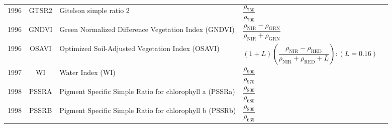 \documentclass[10pt]{article}
\begin{document}
\begin{ThreePartTable}
\begin{longtable}{c c m{2.80in} M{2.80in} M{1.5in}}
  1996 & GTSR2   & Gitelson simple ratio 2                                                        & $\dfrac{\rho_{750}}{\rho_{700}}$                                                                                                                                                                                                                                                        & \citet{Gitelson1996b,Gitelson1997,Lichtenthaler1996}\\
  1996 & GNDVI   & Green Normalized Difference Vegetation Index (GNDVI)                           & $\dfrac{\rho_\text{NIR}-\rho_\text{GRN}}{\rho_\text{NIR}+\rho_\text{GRN}}$                                                                                                                                                                                                              & \citet{Gitelson1996a}                               \\
  1996 & OSAVI   & Optimized Soil-Adjusted Vegetation Index (OSAVI)                               & $(1 + L)\left(\dfrac{\rho_\text{NIR}-\rho_\text{RED}}{\rho_\text{NIR}+\rho_\text{RED}+L}\right):(L=0.16)$                                                                                                                                                                               & \citet{Rondeaux1996}                                \\
  1997 & WI      & Water Index (WI)                                                               & $\dfrac{\rho_{900}}{\rho_{970}}$                                                                                                                                                                                                                                                        & \citet{Penuelas1997}                                \\
  1998 & PSSRA   & Pigment Specific Simple Ratio for chlorophyll a (PSSRa)                        & $\dfrac{\rho_{800}}{\rho_{680}}$                                                                                                                                                                                                                                                        & \citet{Blackburn1998a,Blackburn1998b}               \\
  1998 & PSSRB   & Pigment Specific Simple Ratio for chlorophyll b (PSSRb)                        & $\dfrac{\rho_{800}}{\rho_{635}}$                                                                                                                                                                                                                                                        & \citet{Blackburn1998a,Blackburn1998b}               \\

\end{longtable}
\end{ThreePartTable}
\end{document}
